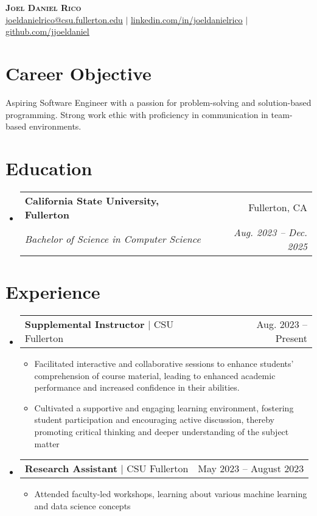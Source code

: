 \documentclass[letterpaper,11pt]{article}
\makeatletter
\newcommand{\resumeItem}[1]{
  \item\small{
    {#1 \vspace{-2pt}}
  }
}
\newcommand{\resumeSubheading}[4]{
  \vspace{-2pt}\item
    \begin{tabular*}{0.97\textwidth}[t]{l@{\extracolsep{\fill}}r}
      \textbf{#1} & #2 \\
      \textit{\small#3} & \textit{\small #4} \\
    \end{tabular*}\vspace{-7pt}
}
\newcommand{\resumeProjectHeading}[2]{
    \item
    \begin{tabular*}{0.97\textwidth}{l@{\extracolsep{\fill}}r}
      \small#1 & #2 \\
    \end{tabular*}\vspace{-7pt}
}
\newcommand{\resumeSubHeadingListStart}{\begin{itemize}[leftmargin=0.15in, label={}]}
\newcommand{\resumeSubHeadingListEnd}{\end{itemize}}
\newcommand{\resumeItemListStart}{\begin{itemize}}
\newcommand{\resumeItemListEnd}{\end{itemize}\vspace{-5pt}}
\makeatother
\begin{document}
\begin{center}
    \textbf{\Huge \scshape Joel Daniel Rico} \\ \vspace{1pt}
    \small \href{mailto:joeldanielrico@csu.fullerton.edu.com}{\underline{joeldanielrico@csu.fullerton.edu}} $|$ 
    \href{https://linkedin.com/in/joeldanielrico}{\underline{linkedin.com/in/joeldanielrico}} $|$
    \href{https://github.com/jjoeldaniel}{\underline{github.com/jjoeldaniel }}
\end{center}


\section{Career Objective}
  Aspiring Software Engineer with a passion for problem-solving and solution-based programming. Strong
  work ethic with proficiency in communication in team-based environments.

\section{Education}
  \resumeSubHeadingListStart
    \resumeSubheading
      {California State University, Fullerton}{Fullerton, CA}
      {Bachelor of Science in Computer Science}{Aug. 2023 -- Dec. 2025}
  \resumeSubHeadingListEnd

\section{Experience}
  \resumeSubHeadingListStart
    \resumeProjectHeading
          {\textbf{Supplemental Instructor} $|$ {CSU Fullerton}}{Aug. 2023 -- Present}
          \resumeItemListStart
            \resumeItem{Facilitated interactive and collaborative sessions to enhance students' comprehension of course material, leading to enhanced academic performance and increased confidence in their abilities.}
            \resumeItem{Cultivated a supportive and engaging learning environment, fostering student participation and encouraging active discussion, thereby promoting critical thinking and deeper understanding of the subject matter}
          \resumeItemListEnd
    \resumeProjectHeading
          {\textbf{Research Assistant} $|$ {CSU Fullerton}}{May 2023 -- August 2023}
          \resumeItemListStart
            \resumeItem{Attended faculty-led workshops, learning about various machine learning and data science concepts}
          \resumeItemListEnd
  \resumeSubHeadingListEnd
\end{document}
